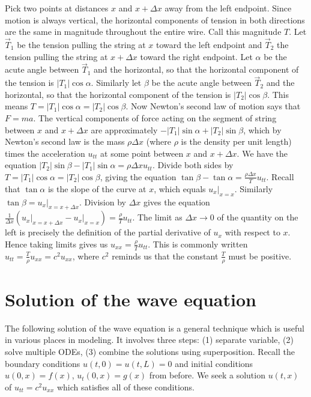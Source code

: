 Pick two points at distances $x$ and $x+\Delta x$ away from the left endpoint. Since motion is always vertical, the horizontal components of tension in both directions are the same in magnitude throughout the entire wire. Call this magnitude $T$. Let $\vec T_1$ be the tension pulling the string at $x$ toward the left endpoint and $\vec T_2$ the tension pulling the string at $x+\Delta x$ toward the right endpoint. Let $\alpha$ be the acute angle between $\vec T_1$ and the horizontal, so that the horizontal component of the tension is $|T_1|\cos\alpha$. Similarly let  $\beta$   be the acute angle between $\vec T_2$ and the horizontal, so that the horizontal component of the tension is $|T_2|\cos\beta$.  This means $T=|T_1|\cos\alpha=|T_2|\cos\beta$.  Now Newton's second law of motion says that $F=ma$.  The vertical components of force acting on the segment of string between $x$ and $x+\Delta x$ are approximately $-|T_1|\sin\alpha +|T_2|\sin\beta$, which by Newton's second law is the mass $\rho \Delta x$ (where $\rho$ is the density per unit length) times the acceleration $u_{tt}$ at some point between $x$ and $x+\Delta x$.  We have the equation  $|T_2|\sin\beta-|T_1|\sin\alpha = \rho \Delta x u_{tt}$.  Divide both sides by $T=|T_1|\cos\alpha=|T_2|\cos\beta$, giving the equation $\tan\beta-\tan\alpha = \frac{\rho \Delta x}{T} u_{tt}$.  Recall that $\tan\alpha$ is the slope of the curve at $x$, which equals $u_x\big|_{x=x}$. Similarly $\tan\beta=u_x\big|_{x=x+\Delta x}$. Division by $\Delta x$ gives the equation $\frac{1}{\Delta x}(u_x\big|_{x=x+\Delta x} -u_x\big|_{x=x} ) = \frac{\rho }{T} u_{tt}$.  The limit as $\Delta x\to 0$ of the quantity on the left is precisely the definition of the partial derivative of $u_x$ with respect to $x$.  Hence taking limits gives us $u_{xx} = \frac{\rho}{T}u_{tt}$.  This is commonly written $u_{tt} = \frac{T}{\rho}u_{xx} = c^2u_{xx}$, where $c^2$ reminds us that the constant $\frac{T}{\rho}$ must be positive.


\section{Solution of the wave equation}

The following solution of the wave equation is a general technique which is useful in various places in modeling. It involves three steps: (1) separate variable, (2) solve multiple ODEs, (3) combine the solutions using superposition. Recall the boundary conditions $u(t,0)=u(t,L) = 0$ and initial conditions $u(0,x) = f(x)$, $u_t(0,x)=g(x)$ from before.  We seek a solution $u(t,x)$ of  $u_{tt}  = c^2u_{xx}$ which satisfies all of these conditions. 
